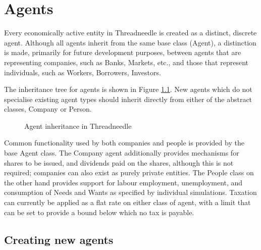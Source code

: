 \documentclass[10pt,oneside,openright, a4paper]{memoir}
\begin{document}
\chapter{Agents}
\label{ch:agents}
Every economically active entity in Threadneedle is created as a
distinct, discrete agent. Although all agents inherit from the same
base class (Agent), a distinction is
made, primarily for future development purposes, between agents that
are representing companies, such as Banks, Markets, etc., and those
that represent individuals, such as Workers, Borrowers, Investors.
\par
The inheritance tree for agents is shown in
Figure \ref{fig:inheritance}. New agents which do not specialise existing
agent types should inherit directly from either of the abstract classes, 
Company or Person. 
\par
\par
\begin{figure}[ht]
\begin{center}
\end{center}
\caption{Agent inheritance in Threadneedle}
\label{fig:inheritance}
\end{figure}
Common functionality used by both companies and people is provided
by the base Agent class.
The Company agent additionally provides mechanisms for shares to be issued,
and dividends paid on the shares, although this is not required; companies
can also exist as purely private entities. The People class on the other
hand provides support for labour employment, unemployment,  and consumption
of Needs and Wants as specified by individual simulations.
Taxation can currently be applied as a flat rate on either class of agent,
with a limit that can be set to provide a bound below which no tax is
payable.
\par
\section{Creating new agents}
\end{document}
